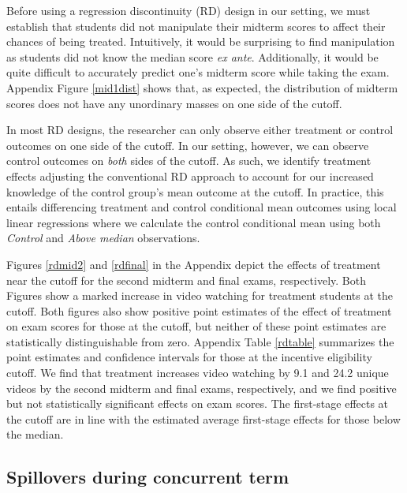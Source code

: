 \documentclass[12pt]{article}
\begin{document}
Before using a regression discontinuity (RD) design in our setting, we must establish that students did not manipulate their midterm scores to affect their chances of being treated. Intuitively, it would be surprising to find manipulation as students did not know the median score \textit{ex ante}. Additionally, it would be quite difficult to accurately predict one's midterm score while taking the exam. Appendix Figure \ref{mid1dist} shows that, as expected, the distribution of midterm scores does not have any unordinary masses on one side of the cutoff.

In most RD designs, the researcher can only observe either treatment or control outcomes on one side of the cutoff. In our setting, however, we can observe control outcomes on \textit{both} sides of the cutoff. As such, we identify treatment effects adjusting the conventional RD approach to account for our increased knowledge of the control group's mean outcome at the cutoff. In practice, this entails differencing treatment and control conditional mean outcomes using local linear regressions where we calculate the control conditional mean using both \textit{Control} and \textit{Above median} observations.

Figures \ref{rdmid2} and \ref{rdfinal} in the Appendix depict the effects of treatment near the cutoff for the second midterm and final exams, respectively. Both Figures show a marked increase in video watching for treatment students at the cutoff. Both figures also show positive point estimates of the effect of treatment on exam scores for those at the cutoff, but neither of these point estimates are statistically distinguishable from zero. Appendix Table \ref{rdtable} summarizes the point estimates and confidence intervals for those at the incentive eligibility cutoff. We find that treatment increases video watching by 9.1 and 24.2 unique videos by the second midterm and final exams, respectively, and we find positive but not statistically significant effects on exam scores. The first-stage effects at the cutoff are in line with the estimated average first-stage effects for those below the median.

\subsection{Spillovers during concurrent term}
\end{document}

